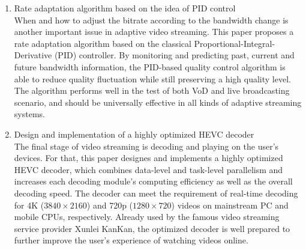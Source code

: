 \begin{eabstract}
\begin{enumerate}
\item {Rate adaptation algorithm based on the idea of PID control}\\
When and how to adjust the bitrate according to the bandwidth change is another important issue in adaptive video streaming. This paper proposes a rate adaptation algorithm based on the classical Proportional-Integral-Derivative (PID) controller. By monitoring and predicting past, current and future bandwidth information, the PID-based quality control algorithm is able to reduce quality fluctuation while still preserving a high quality level. The algorithm performs well in the test of both VoD and live broadcasting scenario, and should be universally effective in all kinds of adaptive streaming systems.
\item {Design and implementation of a highly optimized HEVC decoder}\\
The final stage of video streaming is decoding and playing on the user's devices. For that, this paper designes and implements a highly optimized HEVC decoder, which combines data-level and task-level parallelism and increases each decoding module's computing efficiency as well as the overall decoding speed. The decoder can meet the requirement of real-time decoding for 4K ($3840 \times 2160$) and 720p ($1280 \times 720$) videos on mainstream PC and mobile CPUs, respectively. Already used by the famous video streaming service provider Xunlei KanKan, the optimized decoder is well prepared to further improve the user's experience of watching videos online.
\end{enumerate}
\end{eabstract}